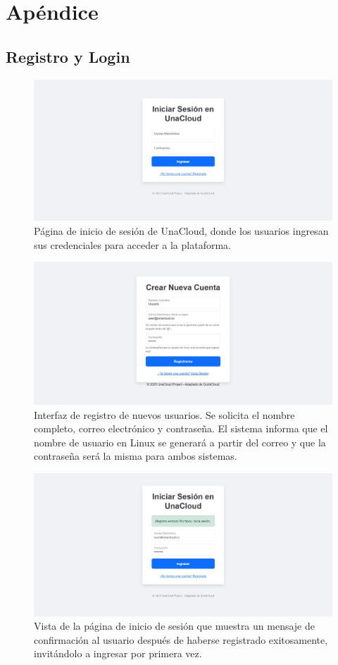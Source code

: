\section{Apéndice}

\subsection{Registro y Login}

\begin{figure}[H]
    \centering
    \includegraphics[width=0.75\linewidth]{Documento Final/Imagenes/LogIn.jpg}
    \caption{Página de inicio de sesión de UnaCloud, donde los usuarios ingresan sus credenciales para acceder a la plataforma.}
    \label{fig:LogIn}
\end{figure}

\begin{figure}[H]
    \centering
    \includegraphics[width=0.75\linewidth]{Documento Final/Imagenes/Register.jpg}
    \caption{Interfaz de registro de nuevos usuarios. Se solicita el nombre completo, correo electrónico y contraseña. El sistema informa que el nombre de usuario en Linux se generará a partir del correo y que la contraseña será la misma para ambos sistemas.}
    \label{fig:SignUp}
\end{figure}

\begin{figure}[H]
    \centering
    \includegraphics[width=0.75\linewidth]{Documento Final/Imagenes/LoginConRegistro.jpg}
    \caption{Vista de la página de inicio de sesión que muestra un mensaje de confirmación al usuario después de haberse registrado exitosamente, invitándolo a ingresar por primera vez.}
    \label{fig:LogIn2}
\end{figure}

